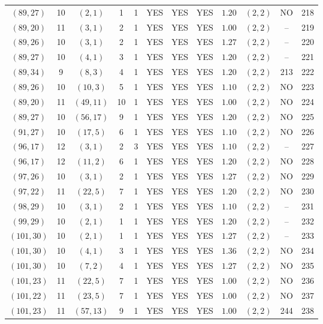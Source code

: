 \begin{longtable}{|c|c|c|c|c|c|c|c|c|c|c|c|}
$(89,27)$ & 10 & $(2,1)$ & 1 & 1 & YES & YES & YES & $1.20$ & $(2,2)$ & NO & 218\\
$(89,20)$ & 11 & $(3,1)$ & 2 & 1 & YES & YES & YES & $1.00$ & $(2,2)$ & -- & 219\\
$(89,26)$ & 10 & $(3,1)$ & 2 & 1 & YES & YES & YES & $1.27$ & $(2,2)$ & -- & 220\\
$(89,27)$ & 10 & $(4,1)$ & 3 & 1 & YES & YES & YES & $1.20$ & $(2,2)$ & -- & 221\\
$(89,34)$ & 9 & $(8,3)$ & 4 & 1 & YES & YES & YES & $1.20$ & $(2,2)$ & 213 & 222\\
$(89,26)$ & 10 & $(10,3)$ & 5 & 1 & YES & YES & YES & $1.10$ & $(2,2)$ & NO & 223\\
$(89,20)$ & 11 & $(49,11)$ & 10 & 1 & YES & YES & YES & $1.00$ & $(2,2)$ & NO & 224\\
$(89,27)$ & 10 & $(56,17)$ & 9 & 1 & YES & YES & YES & $1.20$ & $(2,2)$ & NO & 225\\
$(91,27)$ & 10 & $(17,5)$ & 6 & 1 & YES & YES & YES & $1.10$ & $(2,2)$ & NO & 226\\
$(96,17)$ & 12 & $(3,1)$ & 2 & 3 & YES & YES & YES & $1.10$ & $(2,2)$ & -- & 227\\
$(96,17)$ & 12 & $(11,2)$ & 6 & 1 & YES & YES & YES & $1.20$ & $(2,2)$ & NO & 228\\
$(97,26)$ & 10 & $(3,1)$ & 2 & 1 & YES & YES & YES & $1.27$ & $(2,2)$ & NO & 229\\
$(97,22)$ & 11 & $(22,5)$ & 7 & 1 & YES & YES & YES & $1.20$ & $(2,2)$ & NO & 230\\
$(98,29)$ & 10 & $(3,1)$ & 2 & 1 & YES & YES & YES & $1.10$ & $(2,2)$ & -- & 231\\
$(99,29)$ & 10 & $(2,1)$ & 1 & 1 & YES & YES & YES & $1.20$ & $(2,2)$ & -- & 232\\
$(101,30)$ & 10 & $(2,1)$ & 1 & 1 & YES & YES & YES & $1.27$ & $(2,2)$ & -- & 233\\
$(101,30)$ & 10 & $(4,1)$ & 3 & 1 & YES & YES & YES & $1.36$ & $(2,2)$ & NO & 234\\
$(101,30)$ & 10 & $(7,2)$ & 4 & 1 & YES & YES & YES & $1.27$ & $(2,2)$ & NO & 235\\
$(101,23)$ & 11 & $(22,5)$ & 7 & 1 & YES & YES & YES & $1.00$ & $(2,2)$ & NO & 236\\
$(101,22)$ & 11 & $(23,5)$ & 7 & 1 & YES & YES & YES & $1.00$ & $(2,2)$ & NO & 237\\
$(101,23)$ & 11 & $(57,13)$ & 9 & 1 & YES & YES & YES & $1.00$ & $(2,2)$ & 244 & 238\\

\end{longtable}
